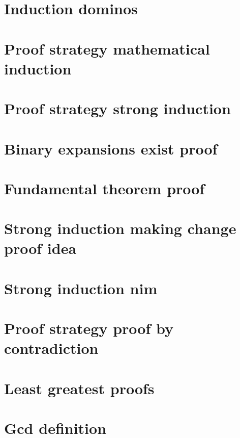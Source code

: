 \section*{Induction dominos}

\vfill
\section*{Proof strategy mathematical induction}

\vfill
\section*{Proof strategy strong induction}

\vfill
\section*{Binary expansions exist proof}

\vfill
\section*{Fundamental theorem proof}

\vfill
\section*{Strong induction making change proof idea}

\vfill
\section*{Strong induction nim}

\vfill
\section*{Proof strategy proof by contradiction}

\vfill
\section*{Least greatest proofs}

\vfill
\section*{Gcd definition}

\vfill

